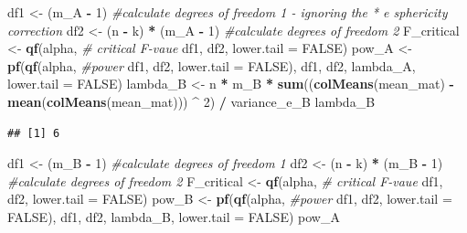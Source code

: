 \documentclass[]{book}
\newenvironment{Shaded}{\begin{snugshade}}{\end{snugshade}}
\newcommand{\CommentTok}[1]{\textcolor[rgb]{0.56,0.35,0.01}{\textit{#1}}}
\newcommand{\DataTypeTok}[1]{\textcolor[rgb]{0.13,0.29,0.53}{#1}}
\newcommand{\DecValTok}[1]{\textcolor[rgb]{0.00,0.00,0.81}{#1}}
\newcommand{\KeywordTok}[1]{\textcolor[rgb]{0.13,0.29,0.53}{\textbf{#1}}}
\newcommand{\NormalTok}[1]{#1}
\newcommand{\OperatorTok}[1]{\textcolor[rgb]{0.81,0.36,0.00}{\textbf{#1}}}
\newcommand{\OtherTok}[1]{\textcolor[rgb]{0.56,0.35,0.01}{#1}}
\newcommand{\StringTok}[1]{\textcolor[rgb]{0.31,0.60,0.02}{#1}}
\begin{document}
\begin{Shaded}
\begin{Highlighting}[]
\NormalTok{df1 <-}\StringTok{ }\NormalTok{(m_A }\OperatorTok{-}\StringTok{ }\DecValTok{1}\NormalTok{) }\CommentTok{#calculate degrees of freedom 1 - ignoring the * e sphericity correction}
\NormalTok{df2 <-}\StringTok{ }\NormalTok{(n }\OperatorTok{-}\StringTok{ }\NormalTok{k) }\OperatorTok{*}\StringTok{ }\NormalTok{(m_A }\OperatorTok{-}\StringTok{ }\DecValTok{1}\NormalTok{) }\CommentTok{#calculate degrees of freedom 2}
\NormalTok{F_critical <-}\StringTok{ }\KeywordTok{qf}\NormalTok{(alpha, }\CommentTok{# critical F-vaue}
\NormalTok{                 df1,}
\NormalTok{                 df2, }
                 \DataTypeTok{lower.tail =} \OtherTok{FALSE}\NormalTok{) }
\NormalTok{pow_A <-}\StringTok{ }\KeywordTok{pf}\NormalTok{(}\KeywordTok{qf}\NormalTok{(alpha, }\CommentTok{#power }
\NormalTok{             df1, }
\NormalTok{             df2, }
             \DataTypeTok{lower.tail =} \OtherTok{FALSE}\NormalTok{), }
\NormalTok{          df1, }
\NormalTok{          df2, }
\NormalTok{          lambda_A, }
          \DataTypeTok{lower.tail =} \OtherTok{FALSE}\NormalTok{)}
\NormalTok{lambda_B <-}\StringTok{ }\NormalTok{n }\OperatorTok{*}\StringTok{ }\NormalTok{m_B }\OperatorTok{*}\StringTok{ }\KeywordTok{sum}\NormalTok{((}\KeywordTok{colMeans}\NormalTok{(mean_mat) }\OperatorTok{-}\StringTok{ }\KeywordTok{mean}\NormalTok{(}\KeywordTok{colMeans}\NormalTok{(mean_mat))) }\OperatorTok{^}\StringTok{ }\DecValTok{2}\NormalTok{) }\OperatorTok{/}\StringTok{ }\NormalTok{variance_e_B }
\NormalTok{lambda_B}
\end{Highlighting}
\end{Shaded}

\begin{verbatim}
## [1] 6
\end{verbatim}

\begin{Shaded}
\begin{Highlighting}[]
\NormalTok{df1 <-}\StringTok{ }\NormalTok{(m_B }\OperatorTok{-}\StringTok{ }\DecValTok{1}\NormalTok{) }\CommentTok{#calculate degrees of freedom 1}
\NormalTok{df2 <-}\StringTok{ }\NormalTok{(n }\OperatorTok{-}\StringTok{ }\NormalTok{k) }\OperatorTok{*}\StringTok{ }\NormalTok{(m_B }\OperatorTok{-}\StringTok{ }\DecValTok{1}\NormalTok{) }\CommentTok{#calculate degrees of freedom 2}
\NormalTok{F_critical <-}\StringTok{ }\KeywordTok{qf}\NormalTok{(alpha, }\CommentTok{# critical F-vaue}
\NormalTok{                 df1,}
\NormalTok{                 df2,}
                 \DataTypeTok{lower.tail =} \OtherTok{FALSE}\NormalTok{) }
\NormalTok{pow_B <-}\StringTok{ }\KeywordTok{pf}\NormalTok{(}\KeywordTok{qf}\NormalTok{(alpha, }\CommentTok{#power }
\NormalTok{             df1, }
\NormalTok{             df2, }
             \DataTypeTok{lower.tail =} \OtherTok{FALSE}\NormalTok{), }
\NormalTok{          df1, }
\NormalTok{          df2, }
\NormalTok{          lambda_B, }
          \DataTypeTok{lower.tail =} \OtherTok{FALSE}\NormalTok{)}
\NormalTok{pow_A}
\end{Highlighting}
\end{Shaded}
\end{document}
